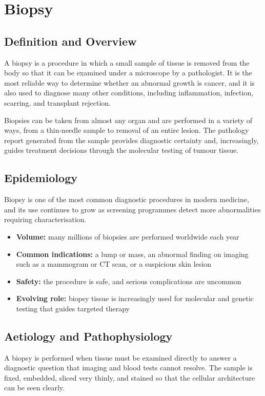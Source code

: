 \chapter{Biopsy}

\section*{Definition and Overview}
A biopsy is a procedure in which a small sample of tissue is removed from the body so that it can be examined under a microscope by a pathologist. It is the most reliable way to determine whether an abnormal growth is cancer, and it is also used to diagnose many other conditions, including inflammation, infection, scarring, and transplant rejection.

Biopsies can be taken from almost any organ and are performed in a variety of ways, from a thin-needle sample to removal of an entire lesion. The pathology report generated from the sample provides diagnostic certainty and, increasingly, guides treatment decisions through the molecular testing of tumour tissue.

\section*{Epidemiology}
Biopsy is one of the most common diagnostic procedures in modern medicine, and its use continues to grow as screening programmes detect more abnormalities requiring characterisation.

\begin{itemize}
    \item \textbf{Volume:} many millions of biopsies are performed worldwide each year
    \item \textbf{Common indications:} a lump or mass, an abnormal finding on imaging such as a mammogram or CT scan, or a suspicious skin lesion
    \item \textbf{Safety:} the procedure is safe, and serious complications are uncommon
    \item \textbf{Evolving role:} biopsy tissue is increasingly used for molecular and genetic testing that guides targeted therapy
\end{itemize}

\section*{Aetiology and Pathophysiology}
A biopsy is performed when tissue must be examined directly to answer a diagnostic question that imaging and blood tests cannot resolve. The sample is fixed, embedded, sliced very thinly, and stained so that the cellular architecture can be seen clearly.

